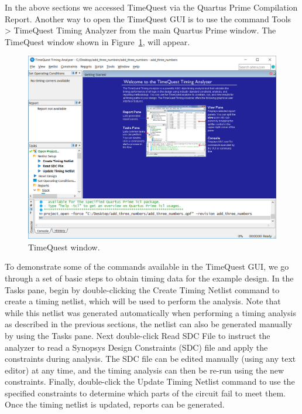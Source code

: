 \documentclass[11pt, twoside, pdftex]{article}
\begin{document}
In the above sections we accessed TimeQuest via the Quartus Prime Compilation Report. Another
way to open the TimeQuest GUI is to use the command {\sf Tools > TimeQuest Timing Analyzer}
from the main Quartus Prime window. The TimeQuest window shown in Figure~\ref{fig:5}, will appear.

\begin{figure}[H]
\begin{center}
\includegraphics[scale=0.5]{figures/figure5.png}
\end{center}
\caption{TimeQuest window.}
\label{fig:5}
\end{figure}

To demonstrate some of the commands available in the TimeQuest GUI, we go through a set of basic 
steps to obtain timing data for the example design. In the Tasks pane, begin by double-clicking
the {\sf Create Timing Netlist} command to create a timing netlist, which will be used to perform 
the analysis. Note that while this netlist was generated automatically when performing a timing 
analysis as described in the previous sections, the netlist can also be generated manually 
by using the Tasks pane. Next double-click {\sf Read SDC File} to instruct the analyzer to 
read a Synopsys Design Constraints (SDC) file and apply the constraints during analysis.
The SDC file can be edited manually (using any text editor) at any time, and the timing
analysis can then be re-run using the new constraints. 
Finally, double-click the {\sf Update Timing Netlist} command to use the specified 
constraints to determine which parts of the circuit fail 
to meet them. Once the timing netlist is updated, reports can be generated.
\end{document}

